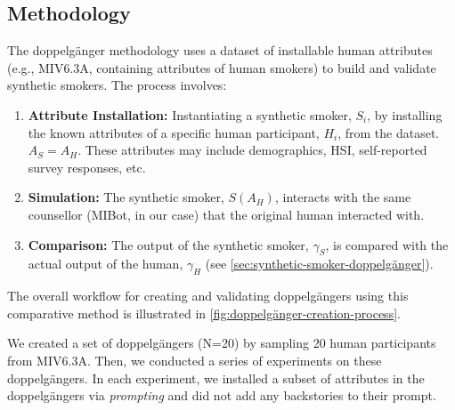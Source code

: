 \subsection{Methodology}
The doppelgänger methodology uses a dataset of installable human attributes (e.g., MIV6.3A, containing attributes of human smokers) to build and validate synthetic smokers. The process involves:

\begin{enumerate}
    \item \textbf{Attribute Installation:} Instantiating a synthetic smoker, $S_i$, by installing the known attributes of a specific human participant, $H_i$, from the dataset. $A_S = A_H$. These attributes may include demographics, HSI, self-reported survey responses, etc.
    \item \textbf{Simulation:} The synthetic smoker, $S(A_H)$, interacts with the same counsellor (MIBot, in our case) that the original human interacted with.
    \item \textbf{Comparison:} The output of the synthetic smoker, $\gamma_S$, is compared with the actual output of the human, $\gamma_H$ (see \cref{sec:synthetic-smoker-doppelgänger}).
\end{enumerate}



The overall workflow for creating and validating doppelgängers using this comparative method is illustrated in \cref{fig:doppelgänger-creation-process}.



We created a set of doppelgängers (N=20) by sampling 20 human participants from MIV6.3A. Then, we conducted a series of experiments on these doppelgängers. In each experiment, we installed a subset of attributes in the doppelgängers via \emph{prompting} and did not add any backstories to their prompt.



